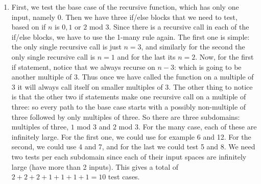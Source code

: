 \documentclass[12pt]{article}
\theoremstyle{definitionstyle}
\begin{document}
\begin{enumerate}[leftmargin=\labelsep]
\begin{enumerate}[label=(\alph*)]
            \item First, we test the base case of the recursive function, which has only one input, namely 0. Then we have three if/else blocks that we need to test, based on if $n$ is $0,1$ or $2$ mod $3$. Since there is a recursive call in each of the if/else blocks, we have to use the 1-many rule again. The first one is simple: the only single recursive call is just $n = 3$, and similarly for the second the only single recursive call is $n=1$ and for the last its $n=2$. Now, for the first if statement, notice that we always recurse on $n-3$: which is going to be another multiple of 3. Thus once we have called the function on a multiple of 3 it will always call itself on smaller multiples of 3. The other thing to notice is that the other two if statements make one recursive call on a multiple of three: so every path to the base case starts with a possibly non-multiple of three followed by only multiples of three. So there are three subdomains: multiples of three, $1$ mod 3 and $2$ mod 3. For the many case, each of these are infinitely large. For the first one, we could use for example 6 and 12. For the second, we could use 4 and 7, and for the last we could test 5 and 8. We need two tests per each subdomain since each of their input spaces are infinitely large (have more than 2 inputs). This gives a total of $2 + 2 + 2 + 1 + 1 + 1 + 1 = 10$ test cases.
        \end{enumerate}


\end{enumerate}
\end{document}
